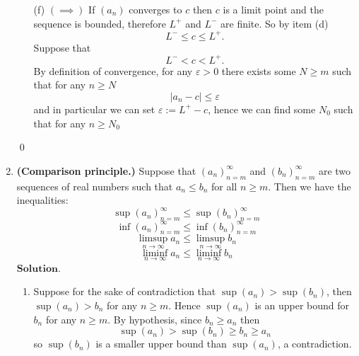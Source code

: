 \documentclass{article}
\theoremstyle{remark}
\begin{document}
\begin{enumerate}
\begin{enumerate}
            \item[(f)] 
            $(\implies)$ If $(a_n)$ converges to $c$ then $c$ is a limit point and the sequence is bounded,
            therefore $L^+$ and $L^-$ are finite. 
            So by item (d)
            \[
            L^- \leq c \leq L^+.
            \]
            Suppose that
            \[
            L^- < c < L^+.
            \]
            By definition of convergence, for any $\varepsilon > 0$ there exists some $N \geq m$ such that for any $n \geq N$
            \[
            \vert a_n - c \vert \leq \varepsilon
            \]
            and in particular we can set $\varepsilon := L^+ - c$, hence we can find 
            some $N_0$ such that for any $n \geq N_0$

            

        \end{enumerate}

        \begin{flushright}
            \qed
        \end{flushright}

        \item \textbf{(Comparison principle.)} Suppose that \( (a_n)_{n=m}^{\infty} \) and 
        \( (b_n)_{n=m}^{\infty} \) are two sequences of real numbers 
        such that \( a_n \leq b_n \) for all \( n \geq m \). 
        Then we have the inequalities:
        \[
            \sup(a_n)_{n=m}^{\infty} \leq \sup(b_n)_{n=m}^{\infty}
        \]
        \[
            \inf(a_n)_{n=m}^{\infty} \leq \inf(b_n)_{n=m}^{\infty}
        \]
        \[
            \limsup_{n \to \infty} a_n \leq \limsup_{n \to \infty} b_n
        \]
        \[
            \liminf_{n \to \infty} a_n \leq \liminf_{n \to \infty} b_n
        \]
        $\textbf{Solution.}$
        \begin{enumerate}
            \item Suppose for the sake of contradiction that $\sup(a_n) > \sup(b_n)$,
            then $\sup(a_n) > b_n$ for any $n \geq m$.
            Hence $\sup(a_n)$ is an upper bound for $b_n$ for any $n \geq m$. 
            By hypothesis, since $b_n \geq a_n$ then
            \[
            \sup(a_n) > \sup(b_n) \geq b_n \geq a_n
            \]
            so $\sup(b_n)$ is a smaller upper bound than $\sup(a_n)$, a contradiction.


\end{enumerate}
\end{enumerate}
\end{document}
